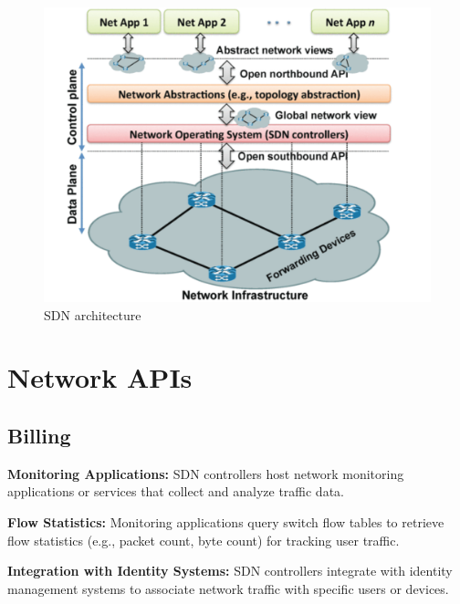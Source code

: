 \documentclass[conference]{IEEEtran}
\begin{document}
\cite{6994333}
\begin{figure}[htbp]
	\centering
	\includegraphics[width=0.8\linewidth]{pics/sdn_architecture.png}
	\caption{SDN architecture}
	\label{fig:sdn}
\end{figure}

\section{Network APIs}\label{AA}

\subsection{Billing}
\textbf{Monitoring Applications:} SDN controllers host network monitoring applications or services that collect and analyze traffic data.

\textbf{Flow Statistics:} Monitoring applications query switch flow tables to retrieve flow statistics (e.g., packet count, byte count) for tracking user traffic.

\textbf{Integration with Identity Systems:} SDN controllers integrate with identity management systems to associate network traffic with specific users or devices.



	
	
\end{document}
